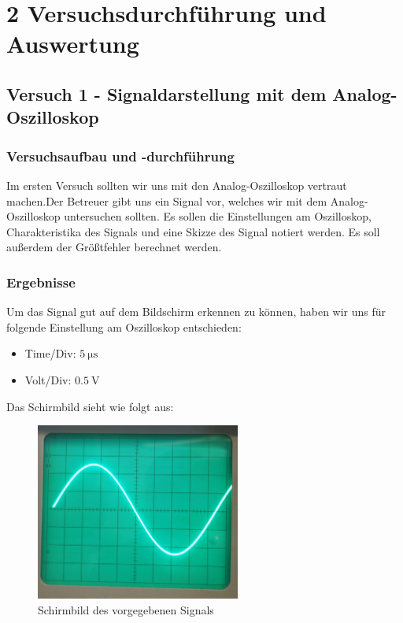 \chapter*{2 Versuchsdurchführung und Auswertung}
\setcounter{chapter}{2}
\setcounter{section}{0}
\setcounter{subsection}{0}

\section{Versuch 1 - Signaldarstellung mit dem Analog-Oszilloskop}

    \subsection{Versuchsaufbau und -durchführung}
    
        Im ersten Versuch sollten wir uns mit den Analog-Oszilloskop vertraut machen.Der Betreuer gibt uns ein Signal vor, welches wir mit dem Analog-Oszilloskop untersuchen sollten. Es sollen die Einstellungen am Oszilloskop, Charakteristika des Signals und eine Skizze des Signal notiert werden. Es soll außerdem der Größtfehler berechnet werden.
        
    \subsection{Ergebnisse}

        Um das Signal gut auf dem Bildschirm erkennen zu können, haben wir uns für folgende Einstellung am Oszilloskop entschieden:
   
        \begin{itemize}
            \item Time/Div: $5\ \mathrm{\mu s}$
            \item Volt/Div: $0.5\ \mathrm{V}$
        \end{itemize}

        Das Schirmbild sieht wie folgt aus:

        \begin{figure}[H]
            \centering
            \includegraphics[width=0.6\textwidth]{bilder/Versuch_1.png}
            \caption{Schirmbild des vorgegebenen Signals}
            \label{fig:Versuch1_Schirmbild}
        \end{figure}

